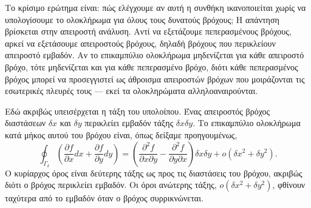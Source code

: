 \documentclass[11pt,a4paper,twoside,openright]{book}
\begin{document}
Το κρίσιμο ερώτημα είναι: πώς ελέγχουμε αν αυτή η συνθήκη ικανοποιείται χωρίς να υπολογίσουμε το ολοκλήρωμα για όλους τους δυνατούς βρόχους; Η απάντηση βρίσκεται στην απειροστή ανάλυση. Αντί να εξετάζουμε πεπερασμένους βρόχους, αρκεί να εξετάσουμε απειροστούς βρόχους, δηλαδή βρόχους που περικλείουν απειροστό εμβαδόν. Αν το επικαμπύλιο ολοκλήρωμα μηδενίζεται για κάθε απειροστό βρόχο, τότε μηδενίζεται και για κάθε πεπερασμένο βρόχο, διότι κάθε πεπερασμένος βρόχος μπορεί να προσεγγιστεί ως άθροισμα απειροστών βρόχων που μοιράζονται τις εσωτερικές πλευρές τους --- εκεί τα ολοκληρώματα αλληλοαναιρούνται.

Εδώ ακριβώς υπεισέρχεται η τάξη του υπολοίπου. Ένας απειροστός βρόχος διαστάσεων \(\delta x\) και \(\delta y\) περικλείει εμβαδόν τάξης \(\delta x \delta y\). Το επικαμπύλιο ολοκλήρωμα κατά μήκος αυτού του βρόχου είναι, όπως δείξαμε προηγουμένως,
\begin{equation}
\oint_{\Gamma_{\delta}} \left( \frac{\partial f}{\partial x} dx + \frac{\partial f}{\partial y} dy \right) = \left( \frac{\partial^2 f}{\partial x \partial y} - \frac{\partial^2 f}{\partial y \partial x} \right) \delta x \delta y + o(\delta x^2 + \delta y^2).
\end{equation}
Ο κυρίαρχος όρος είναι δεύτερης τάξης ως προς τις διαστάσεις του βρόχου, ακριβώς διότι ο βρόχος περικλείει εμβαδόν. Οι όροι ανώτερης τάξης, \(o(\delta x^2 + \delta y^2)\), φθίνουν ταχύτερα από το εμβαδόν όταν ο βρόχος συρρικνώνεται.
\end{document}

